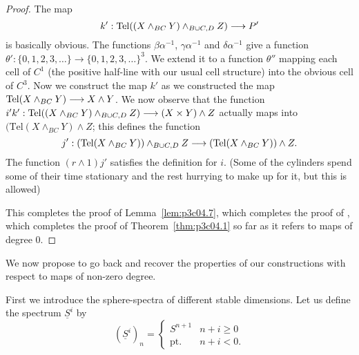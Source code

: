 \documentclass[../main]{subfiles}
\begin{document}
\begin{proof}
The map $$k' : \mathrm{Tel}((X \wedge_{BC} Y) \wedge_{B \cup C, D} Z) \overset{}{\longrightarrow} P'$$ is basically obvious. The functions $\beta \alpha^{-1}$, $\gamma \alpha^{-1}$ and $\delta \alpha^{-1}$ give a function $\theta' : \{0, 1, 2, 3, \ldots\} \to \{0, 1, 2, 3, \ldots\}^3$. We extend it to a function $\theta''$ mapping each cell of $C^1$ (the positive half-line with our usual cell structure) into the obvious cell of $C^3$. Now we construct the map $k'$ as we constructed the map $\mathrm{Tel}(X \wedge_{BC} Y) \overset{}{\longrightarrow} X \wedge Y$.
We now observe that the function $i'k' : \mathrm{Tel}((X \wedge_{BC} Y) \wedge_{B \cup C, D} Z) \overset{}{\longrightarrow} (X \times Y) \wedge Z$ actually maps into $(\mathrm{Tel}(X \wedge_{BC} Y) \wedge Z$; this defines the function $$j' : (\mathrm{Tel}(X \wedge_{BC} Y)) \wedge_{B \cup C, D} Z \overset{}{\longrightarrow} (\mathrm{Tel}(X \wedge_{BC} Y)) \wedge Z.$$ The function $(r \wedge 1) j'$ satisfies the definition for $i$. (Some of the cylinders spend some of their time stationary and the rest hurrying to make up for it, but this is allowed) 

This completes the proof of Lemma~\ref{lem:p3c04.7}, which completes the proof of , which completes the proof of Theorem~\ref{thm:p3c04.1} so far as it refers to maps of degree $0$. 
\end{proof}

We now propose to go back and recover the properties of our constructions with respect to maps of non-zero degree.

First we introduce the sphere-spectra of different stable dimensions. Let us define the spectrum $\underline S^i$ by $$(\underline S^i)_n = \begin{cases}S^{n + 1} & n + i \ge 0 \\ \mathrm{pt.} & n + i < 0.\end{cases}$$
\end{document}
